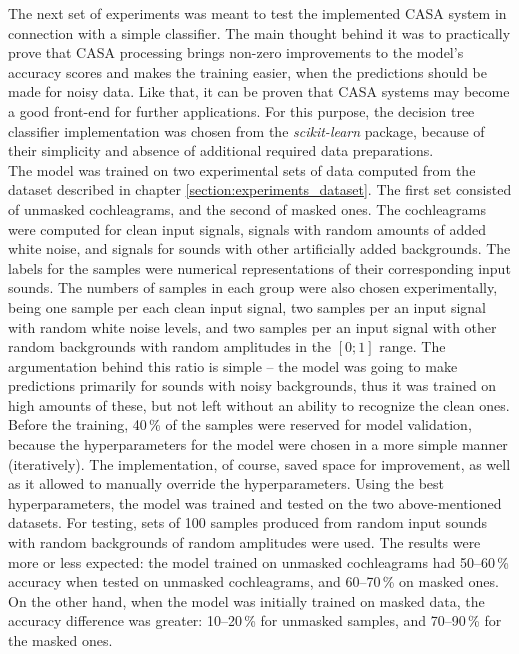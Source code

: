 The next set of experiments was meant to test the implemented CASA system in connection with a simple classifier. The main thought behind it was to practically prove that CASA processing brings non-zero improvements to the model's accuracy scores and makes the training easier, when the predictions should be made for noisy data. Like that, it can be proven that CASA systems may become a good front-end for further applications. For this purpose, the decision tree classifier implementation was chosen from the \textit{scikit-learn} \cite{scikit-learn} package, because of their simplicity and absence of additional required data preparations.\\

The model was trained on two experimental sets of data computed from the dataset described in chapter \ref{section:experiments_dataset}. The first set consisted of unmasked cochleagrams, and the second of masked ones. The cochleagrams were computed for clean input signals, signals with random amounts of added white noise, and signals for sounds with other artificially added backgrounds. The labels for the samples were numerical representations of their corresponding input sounds. The numbers of samples in each group were also chosen experimentally, being one sample per each clean input signal, two samples per an input signal with random white noise levels, and two samples per an input signal with other random backgrounds with random amplitudes in the $[0; 1]$ range. The argumentation behind this ratio is simple -- the model was going to make predictions primarily for sounds with noisy backgrounds, thus it was trained on high amounts of these, but not left without an ability to recognize the clean ones.\\

Before the training, 40\,\% of the samples were reserved for model validation, because the hyperparameters for the model were chosen in a more simple manner (iteratively). The implementation, of course, saved space for improvement, as well as it allowed to manually override the hyperparameters. Using the best hyperparameters, the model was trained and tested on the two above-mentioned datasets. For testing, sets of 100 samples produced from random input sounds with random backgrounds of random amplitudes were used. The results were more or less expected: the model trained on unmasked cochleagrams had 50--60\,\% accuracy when tested on unmasked cochleagrams, and 60--70\,\% on masked ones. On the other hand, when the model was initially trained on masked data, the accuracy difference was greater: 10--20\,\% for unmasked samples, and 70--90\,\% for the masked ones.

